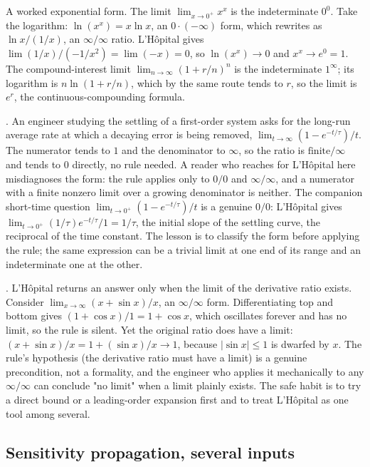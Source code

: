 A worked exponential form. The limit $\lim_{x \to 0^{+}} x^{x}$ is
the indeterminate $0^{0}$. Take the logarithm: $\ln(x^{x}) = x \ln
x$, an $0 \cdot (-\infty)$ form, which rewrites as $\ln x / (1/x)$,
an $\infty/\infty$ ratio. L'H\^opital gives $\lim (1/x)/(-1/x^{2})
= \lim (-x) = 0$, so $\ln(x^{x}) \to 0$ and $x^{x} \to e^{0} = 1$.
The compound-interest limit $\lim_{n \to \infty} (1 + r/n)^{n}$ is
the indeterminate $1^{\infty}$; its logarithm is $n \ln(1 + r/n)$,
which by the same route tends to $r$, so the limit is $e^{r}$, the
continuous-compounding formula.

.
An engineer studying the settling of a first-order system asks for
the long-run average rate at which a decaying error is being removed,
$\lim_{t \to \infty} (1 - e^{-t/\tau})/t$. The numerator tends to
$1$ and the denominator to $\infty$, so the ratio is $\text{finite}/
\infty$ and tends to $0$ directly, no rule needed. A reader who
reaches for L'H\^opital here misdiagnoses the form: the rule applies
only to $0/0$ and $\infty/\infty$, and a numerator with a finite
nonzero limit over a growing denominator is neither. The companion
short-time question $\lim_{t \to 0^{+}} (1 - e^{-t/\tau})/t$ is a
genuine $0/0$: L'H\^opital gives $\lim_{t \to 0^{+}} (1/\tau)
e^{-t/\tau}/1 = 1/\tau$, the initial slope of the settling curve, the
reciprocal of the time constant. The lesson is to classify the form
before applying the rule; the same expression can be a trivial limit
at one end of its range and an indeterminate one at the other.

.
L'H\^opital returns an answer only when the limit of the
derivative ratio exists. Consider $\lim_{x \to \infty} (x + \sin
x)/x$, an $\infty/\infty$ form. Differentiating top and bottom gives
$(1 + \cos x)/1 = 1 + \cos x$, which oscillates forever and has no
limit, so the rule is silent. Yet the original ratio does have a
limit: $(x + \sin x)/x = 1 + (\sin x)/x \to 1$, because $|\sin x|
\le 1$ is dwarfed by $x$. The rule's hypothesis (the derivative
ratio must have a limit) is a genuine precondition, not a
formality, and the engineer who applies it mechanically to any
$\infty/\infty$ can conclude "no limit" when a limit plainly
exists. The safe habit is to try a direct bound or a leading-order
expansion first and to treat L'H\^opital as one tool among several.

\subsection{Sensitivity propagation, several inputs}

